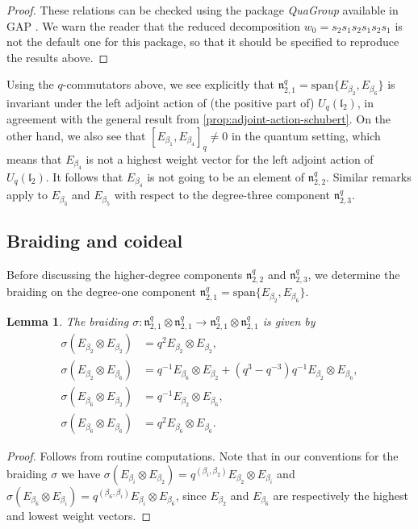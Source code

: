 \documentclass[a4paper, 12pt, reqno, english]{amsart}
\numberwithin{equation}{section}
\numberwithin{figure}{section}
\theoremstyle{plain}
\theoremstyle{plain}
\theoremstyle{plain}
\theoremstyle{plain}
\newtheorem{lemma}[theorem]{Lemma}
\theoremstyle{plain}
\theoremstyle{definition}
\theoremstyle{definition}
\theoremstyle{definition}
\theoremstyle{remark}
\theoremstyle{definition}
\theoremstyle{definition}
\newcommand{\liel}{\mathfrak{l}}
\newcommand{\lien}{\mathfrak{n}}
\newcommand{\lspan}{\mathrm{span}}
\newcommand{\qnil}{\lien^q}
\begin{document}
\begin{proof}
These relations can be checked using the package \emph{QuaGroup} available in GAP \cite{GAP4}.
We warn the reader that the reduced decomposition $w_0 = s_2 s_1 s_2 s_1 s_2 s_1$ is not the default one for this package, so that it should be specified to reproduce the results above.
\end{proof}

Using the $q$-commutators above, we see explicitly that $\qnil_{2, 1} = \lspan \{ E_{\beta_2}, E_{\beta_6} \}$ is invariant under the left adjoint action of (the positive part of) $U_q(\liel_2)$, in agreement with the general result from \cref{prop:adjoint-action-schubert}.
On the other hand, we also see that $[E_{\beta_1}, E_{\beta_4}]_q \neq 0$ in the quantum setting, which means that $E_{\beta_4}$ is not a highest weight vector for the left adjoint action of $U_q(\liel_2)$. It follows that $E_{\beta_4}$ is not going to be an element of $\qnil_{2, 2}$.
Similar remarks apply to $E_{\beta_3}$ and $E_{\beta_5}$ with respect to the degree-three component $\qnil_{2, 3}$.

\subsection{Braiding and coideal}

Before discussing the higher-degree components $\qnil_{2, 2}$ and $\qnil_{2, 3}$, we determine the braiding on the degree-one component $\qnil_{2, 1} = \lspan \{ E_{\beta_2}, E_{\beta_6} \}$.

\begin{lemma}
The braiding $\sigma: \qnil_{2, 1} \otimes \qnil_{2, 1} \to \qnil_{2, 1} \otimes \qnil_{2, 1}$ is given by
\[
\begin{split}
\sigma(E_{\beta_2} \otimes E_{\beta_2}) & = q^2 E_{\beta_2} \otimes E_{\beta_2}, \\
\sigma(E_{\beta_2} \otimes E_{\beta_6}) & = q^{-1} E_{\beta_6} \otimes E_{\beta_2} + (q^3 - q^{-3}) q^{-1} E_{\beta_2} \otimes E_{\beta_6}, \\
\sigma(E_{\beta_6} \otimes E_{\beta_2}) & = q^{-1} E_{\beta_2} \otimes E_{\beta_6}, \\
\sigma(E_{\beta_6} \otimes E_{\beta_6}) & = q^2 E_{\beta_6} \otimes E_{\beta_6}.
\end{split}
\]
\end{lemma}

\begin{proof}
Follows from routine computations.
Note that in our conventions for the braiding $\sigma$ we have $\sigma(E_{\beta_i} \otimes E_{\beta_2}) = q^{(\beta_i, \beta_2)} E_{\beta_2} \otimes E_{\beta_i}$ and $\sigma(E_{\beta_6} \otimes E_{\beta_i}) = q^{(\beta_6, \beta_i)} E_{\beta_i} \otimes E_{\beta_6}$, since $E_{\beta_2}$ and $E_{\beta_6}$ are respectively the highest and lowest weight vectors.
\end{proof}
\end{document}
